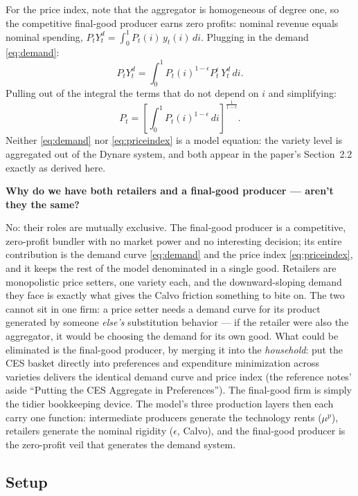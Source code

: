 \documentclass[11pt]{article}
\newcommand{\intuition}[2]{%
  \par\medskip\noindent\hspace*{\fill}%
  \colorbox{intuitionblue}{\parbox{0.94\linewidth}{\textbf{#1}\par\smallskip #2}}%
  \hspace*{\fill}\par\medskip}
\begin{document}
For the price index, note that the aggregator is homogeneous of degree one, so
the competitive final-good producer earns zero profits: nominal revenue equals
nominal spending, $P_t Y_t^{d} = \int_0^1 P_t(i)\,y_t(i)\,di$. Plugging in the
demand \eqref{eq:demand}:
\begin{equation*}
    P_t Y_t^{d} = \int_0^1 P_t(i)^{1-\epsilon} P_t^{\epsilon}\, Y_t^{d}\, di.
\end{equation*}
Pulling out of the integral the terms that do not depend on $i$ and
simplifying:
\begin{equation}\label{eq:priceindex}
    P_t = \left[\int_0^1 P_t(i)^{1-\epsilon}\,di\right]^{\frac{1}{1-\epsilon}}.
\end{equation}
Neither \eqref{eq:demand} nor \eqref{eq:priceindex} is a model equation: the
variety level is aggregated out of the Dynare system, and both appear in the
paper's Section~2.2 exactly as derived here.

\intuition{Why do we have both retailers and a final-good producer --- aren't they the same?}{%
No: their roles are mutually exclusive. The final-good producer is a
competitive, zero-profit bundler with no market power and no interesting
decision; its entire contribution is the demand curve \eqref{eq:demand} and
the price index \eqref{eq:priceindex}, and it keeps the rest of the model
denominated in a single good. Retailers are monopolistic price setters, one
variety each, and the downward-sloping demand they face is exactly what gives
the Calvo friction something to bite on. The two cannot sit in one firm: a
price setter needs a demand curve for its product generated by someone
\emph{else's} substitution behavior --- if the retailer were also the
aggregator, it would be choosing the demand for its own good. What could be
eliminated is the final-good producer, by merging it into the
\emph{household}: put the CES basket directly into preferences and expenditure
minimization across varieties delivers the identical demand curve and price
index (the reference notes' aside ``Putting the CES Aggregate in
Preferences''). The final-good firm is simply the tidier bookkeeping device.
The model's three production layers then each carry one function:
intermediate producers generate the technology rents ($\mu^{p}$), retailers
generate the nominal rigidity ($\epsilon$, Calvo), and the final-good
producer is the zero-profit veil that generates the demand system.}

\subsection{Setup}
\end{document}
